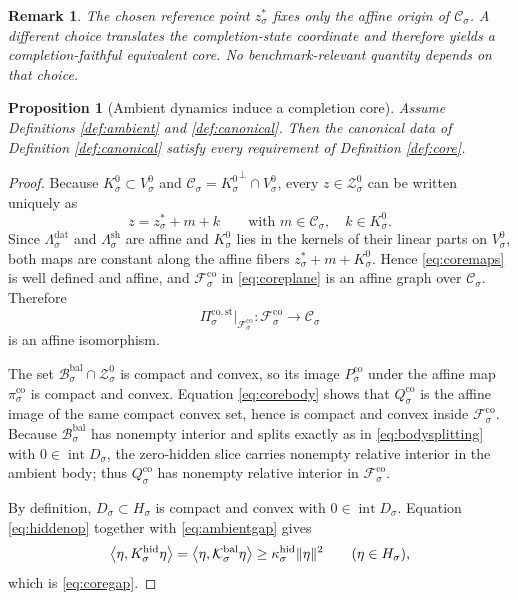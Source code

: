 \documentclass[11pt]{article}
\newcommand{\BalBody}[1]{\mathcal B_{#1}^{\mathrm{bal}}}
\newcommand{\BalData}[1]{\Lambda_{#1}^{\mathrm{dat}}}
\newcommand{\BalShell}[1]{\Lambda_{#1}^{\mathrm{sh}}}
\newcommand{\ZeroHiddenSlice}[1]{\mathcal Z_{#1}^{0}}
\newcommand{\ZeroHiddenVec}[1]{V_{#1}^{0}}
\newcommand{\Kernel}[1]{K_{#1}^{0}}
\newcommand{\BalOp}[1]{\mathcal K_{#1}^{\mathrm{bal}}}
\newcommand{\ReferencePoint}[1]{z_{#1}^{\ast}}
\newcommand{\GapSpace}[1]{H_{#1}}
\newcommand{\GapBody}[1]{D_{#1}}
\newcommand{\HiddenOperator}[1]{K_{#1}^{\mathrm{hid}}}
\newcommand{\CoreState}[1]{\mathcal C_{#1}}
\newcommand{\CoreAffine}[1]{\mathcal F_{#1}^{\mathrm{co}}}
\newcommand{\CoreBody}[1]{Q_{#1}^{\mathrm{co}}}
\newcommand{\CoreStateBody}[1]{P_{#1}^{\mathrm{co}}}
\newcommand{\CoreStateProj}[1]{\Pi_{#1}^{\mathrm{co,st}}}
\newcommand{\CoreCoord}[1]{\pi_{#1}^{\mathrm{co}}}
\newtheorem{proposition}{Proposition}
\newtheorem{remark}{Remark}
\begin{document}
\begin{remark}
The chosen reference point \(\ReferencePoint{\sigma}\) fixes only the affine origin of \(\CoreState{\sigma}\). A different choice translates the completion-state coordinate and therefore yields a completion-faithful equivalent core. No benchmark-relevant quantity depends on that choice.
\end{remark}

\begin{proposition}[Ambient dynamics induce a completion core]
\label{prop:induce}
Assume Definitions \ref{def:ambient} and \ref{def:canonical}. Then the canonical data of Definition \ref{def:canonical} satisfy every requirement of Definition \ref{def:core}.
\end{proposition}

\begin{proof}
Because \(\Kernel{\sigma}\subset\ZeroHiddenVec{\sigma}\) and \(\CoreState{\sigma}={\Kernel{\sigma}}^{\perp}\cap\ZeroHiddenVec{\sigma}\), every \(z\in\ZeroHiddenSlice{\sigma}\) can be written uniquely as
\[
z=\ReferencePoint{\sigma}+m+k
\qquad
\text{with }
m\in\CoreState{\sigma},
\quad
k\in\Kernel{\sigma}.
\]
Since \(\BalData{\sigma}\) and \(\BalShell{\sigma}\) are affine and \(\Kernel{\sigma}\) lies in the kernels of their linear parts on \(\ZeroHiddenVec{\sigma}\), both maps are constant along the affine fibers \(\ReferencePoint{\sigma}+m+\Kernel{\sigma}\). Hence \eqref{eq:coremaps} is well defined and affine, and \(\CoreAffine{\sigma}\) in \eqref{eq:coreplane} is an affine graph over \(\CoreState{\sigma}\). Therefore
\[
\CoreStateProj{\sigma}\big|_{\CoreAffine{\sigma}}:
\CoreAffine{\sigma}\to\CoreState{\sigma}
\]
is an affine isomorphism.

The set \(\BalBody{\sigma}\cap\ZeroHiddenSlice{\sigma}\) is compact and convex, so its image \(\CoreStateBody{\sigma}\) under the affine map \(\CoreCoord{\sigma}\) is compact and convex. Equation \eqref{eq:corebody} shows that \(\CoreBody{\sigma}\) is the affine image of the same compact convex set, hence is compact and convex inside \(\CoreAffine{\sigma}\). Because \(\BalBody{\sigma}\) has nonempty interior and splits exactly as in \eqref{eq:bodysplitting} with \(0\in\operatorname{int}\GapBody{\sigma}\), the zero-hidden slice carries nonempty relative interior in the ambient body; thus \(\CoreBody{\sigma}\) has nonempty relative interior in \(\CoreAffine{\sigma}\).

By definition, \(\GapBody{\sigma}\subset\GapSpace{\sigma}\) is compact and convex with \(0\in\operatorname{int}\GapBody{\sigma}\). Equation \eqref{eq:hiddenop} together with \eqref{eq:ambientgap} gives
\[
\ev{\eta,\HiddenOperator{\sigma}\eta}
=
\ev{\eta,\BalOp{\sigma}\eta}
\ge
\kappa_{\sigma}^{\mathrm{hid}}\|\eta\|^{2}
\qquad
(\eta\in\GapSpace{\sigma}),
\]
which is \eqref{eq:coregap}.


\end{proof}
\end{document}
